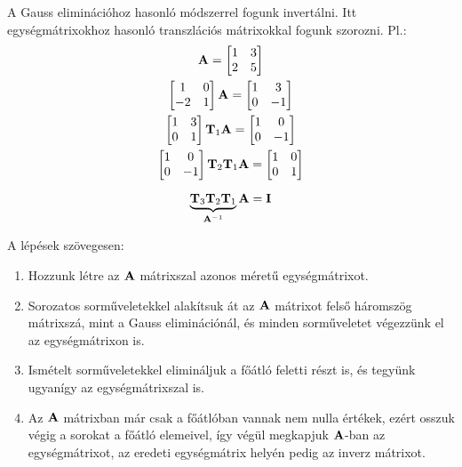 \documentclass[../../main.tex]{subfiles}
\begin{document}
A Gauss eliminációhoz hasonló módszerrel fogunk invertálni. Itt egységmátrixokhoz
hasonló transzlációs mátrixokkal fogunk szorozni. Pl.:
\begin{gather*}
  \mathbf{A} = \begin{bmatrix}
    1 & 3 \\ 2 & 5
  \end{bmatrix}
  \\
  \begin{bmatrix}
    1 & 0 \\ -2 & 1
  \end{bmatrix} \mathbf{A} = \begin{bmatrix}
    1 & 3 \\ 0 & -1
  \end{bmatrix}
  \\
  \begin{bmatrix}
    1 & 3 \\ 0 & 1
  \end{bmatrix} \mathbf{T}_1 \mathbf{A} = \begin{bmatrix}
    1 & 0 \\ 0 & -1
  \end{bmatrix}
  \\
  \begin{bmatrix}
    1 & 0 \\ 0 & -1
  \end{bmatrix} \mathbf{T}_2 \mathbf{T}_1 \mathbf{A} = \begin{bmatrix}
    1 & 0 \\ 0 & 1
  \end{bmatrix}
  \\[2mm]
  \underbrace{\mathbf{T}_3 \mathbf{T}_2 \mathbf{T}_1}_{\mathbf{A}^{-1}} \mathbf{A} = \mathbf{I}
\end{gather*}

A lépések szövegesen:
\begin{enumerate}
  \item Hozzunk létre az $\mathbf{A}$ mátrixszal azonos méretű egységmátrixot.
  \item Sorozatos sorműveletekkel alakítsuk át az $\mathbf{A}$ mátrixot felső
        háromszög mátrixszá, mint a Gauss eliminációnál, és minden sorműveletet
        végezzünk el az egységmátrixon is.
  \item Ismételt sorműveletekkel elimináljuk a főátló feletti részt is, és
        tegyünk ugyanígy az egységmátrixszal is.
  \item Az $\mathbf{A}$ mátrixban már csak a főátlóban vannak nem nulla értékek,
        ezért osszuk végig a sorokat a főátló elemeivel, így végül megkapjuk
        $\mathbf{A}$-ban az egységmátrixot, az eredeti egységmátrix helyén pedig
        az inverz mátrixot.
\end{enumerate}
\end{document}
